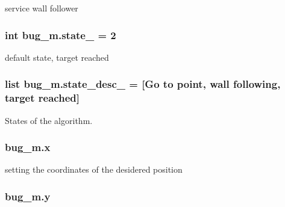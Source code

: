 service wall follower 

\subsubsection[{\texorpdfstring{state\+\_\+}{state_}}]{\setlength{\rightskip}{0pt plus 5cm}int bug\+\_\+m.\+state\+\_\+ = 2}\hypertarget{namespacebug__m_a79dc362dff5bef439beacdd5c0c3b2f1}{}\label{namespacebug__m_a79dc362dff5bef439beacdd5c0c3b2f1}


default state, target reached 

\subsubsection[{\texorpdfstring{state\+\_\+desc\+\_\+}{state_desc_}}]{\setlength{\rightskip}{0pt plus 5cm}list bug\+\_\+m.\+state\+\_\+desc\+\_\+ = \mbox{[}\textquotesingle{}Go to point\textquotesingle{}, \textquotesingle{}wall following\textquotesingle{}, \textquotesingle{}target reached\textquotesingle{}\mbox{]}}\hypertarget{namespacebug__m_ae70f71d3816862f72790fae7bfaa543b}{}\label{namespacebug__m_ae70f71d3816862f72790fae7bfaa543b}


States of the algorithm. 

\subsubsection[{\texorpdfstring{x}{x}}]{\setlength{\rightskip}{0pt plus 5cm}bug\+\_\+m.\+x}\hypertarget{namespacebug__m_af10f89c7f929c9babce108f5d7382996}{}\label{namespacebug__m_af10f89c7f929c9babce108f5d7382996}


setting the coordinates of the desidered position 

\subsubsection[{\texorpdfstring{y}{y}}]{\setlength{\rightskip}{0pt plus 5cm}bug\+\_\+m.\+y}\hypertarget{namespacebug__m_ab8596d2ae799585b0d89152b55891aa8}{}\label{namespacebug__m_ab8596d2ae799585b0d89152b55891aa8}


